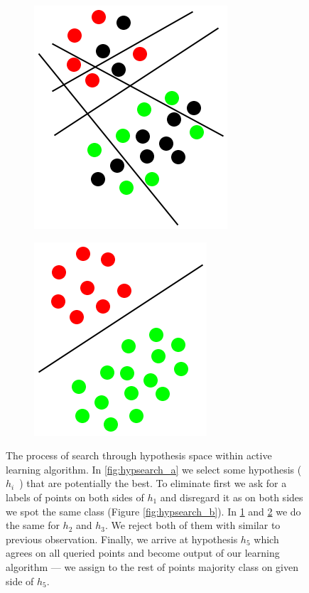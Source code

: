 \documentclass[12pt, a4paper, pdflatex, leqno]{report}
\begin{document}
\begin{figure}[htbp]
\begin{subfigure}[b]{0.3\textwidth}
    \caption{\label{fig:hypsearch_c}}
  \end{subfigure}
  \begin{subfigure}[b]{0.3\textwidth}
    \centering
    \includegraphics[width=0.5\linewidth]{graphics/hypsearch4.png}
    \caption{\label{fig:hypsearch_d}}
  \end{subfigure}
  \begin{subfigure}[b]{0.3\textwidth}
    \centering
    \includegraphics[width=0.5\linewidth]{graphics/hypsearch5.png}
    \caption{\label{fig:hypsearch_e}}
  \end{subfigure}
\begin{tiny}
\caption{The process of search through hypothesis space within active learning algorithm. In \ref{fig:hypsearch_a} we select some hypothesis (~$h_i$~) that are potentially the best. To eliminate first we ask for a labels of points on both sides of $h_1$ and disregard it as on both sides we spot the same class (Figure \ref{fig:hypsearch_b}). In \ref{fig:hypsearch_c} and \ref{fig:hypsearch_d} we do the same for $h_2$ and $h_3$. We reject both of them with similar to previous observation. Finally, we arrive at hypothesis $h_5$ which agrees on all queried points and become output of our learning algorithm --- we assign to the rest of points majority class on given side of $h_5$.\label{fig:hypsearch}}
\end{tiny}
\vspace{1cm}
\end{figure}
\end{document}
